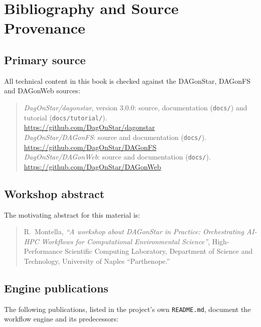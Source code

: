 \chapter*{Bibliography and Source Provenance}

\section*{Primary source}

All technical content in this book is checked against the DAGonStar,
DAGonFS and DAGonWeb sources:

\begin{quote}
\textit{DagOnStar/dagonstar}, version 3.0.0: source, documentation
(\texttt{docs/}) and tutorial (\texttt{docs/tutorial/}).\\
\url{https://github.com/DagOnStar/dagonstar}\\[0.5em]
\textit{DagOnStar/DAGonFS}: source and documentation (\texttt{docs/}).\\
\url{https://github.com/DagOnStar/DAGonFS}\\[0.5em]
\textit{DagOnStar/DAGonWeb}: source and documentation (\texttt{docs/}).\\
\url{https://github.com/DagOnStar/DAGonWeb}
\end{quote}

\section*{Workshop abstract}

The motivating abstract for this material is:

\begin{quote}
R.~Montella, \emph{``A workshop about DAGonStar in Practice: Orchestrating
AI-HPC Workflows for Computational Environmental Science''}, High-Performance
Scientific Computing Laboratory, Department of Science and Technology,
University of Naples ``Parthenope.''
\end{quote}

\section*{Engine publications}

The following publications, listed in the project's own \texttt{README.md},
document the workflow engine and its predecessors:

